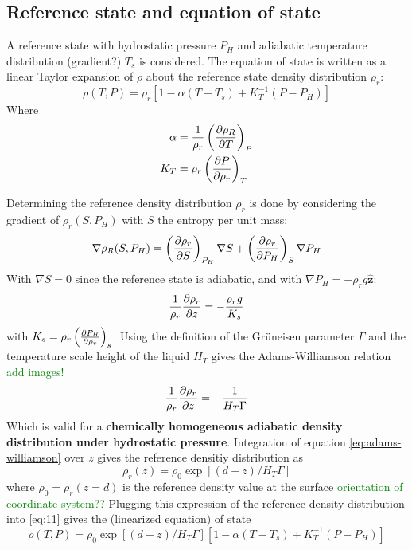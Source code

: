 \documentclass[document.tex]{subfiles}
\begin{document}
\subsection{Reference state and equation of state}
A reference state with hydrostatic pressure $P_H$ and adiabatic temperature distribution (gradient?) $T_s$ is considered. 
The equation of state is written as a linear Taylor expansion of $\rho$ about the reference state density distribution $\rho_r$: 
\begin{equation} \label{eq:11}
    \rho(T,P) = \rho_r[1-\alpha(T-T_s)+K_T^{-1}(P-P_H)]
\end{equation}
Where 
\begin{align}
    \alpha &= \frac{1}{\rho_r} \left(\pdv{\rho_R}{T}\right)_P \\
    K_T &= \rho_r \left(\pdv{P}{\rho_r}\right)_T 
\end{align}

Determining the reference density distribution $\rho_r$ is done by considering the gradient of $\rho_r(S, P_H)$ with $S$ 
the entropy per unit mass: 
\begin{equation}
    \nabla\rho_R(S,P_H) = \left(\pdv{\rho_r}{S}\right)_{P_H} \nabla S + \left(\pdv{\rho_r}{P_H}\right)_S\nabla P_H
\end{equation}
With $\nabla S = 0$ since the reference state is adiabatic, and with $\nabla P_H = -\rho_rg \bm{\hat{z}}$:
\begin{equation}
    \frac{1}{\rho_r} \pdv{\rho_r}{z} = -\frac{\rho_r g}{K_s}
\end{equation} 
with $K_s = \rho_r\left(\pdv{P_H}{\rho_r}\right)_s$. Using the definition of the Grüneisen parameter $\Gamma$ and the temperature scale height of the liquid
$H_T$ gives the Adams-Williamson relation \textcolor{green}{add images!}
\begin{equation} \label{eq:adams-williamson}
    \frac{1}{\rho_r} \pdv{\rho_r}{z} = -\frac{1}{H_T \Gamma}
\end{equation}
Which is valid for a \textbf{chemically homogeneous adiabatic density distribution under hydrostatic pressure}. 
Integration of equation \ref{eq:adams-williamson} over $z$ gives the reference densitiy distribution as
\begin{equation}
    \rho_r(z)= \rho_0 \exp[(d-z)/H_T \Gamma]
\end{equation}
where $\rho_0 = \rho_r(z=d)$ is the reference density value at the surface \textcolor{green}{orientation of coordinate system??}
Plugging this expression of the reference density distribution into \ref{eq:11} gives the (linearized equation) of state
\begin{equation} \label{eq:16}
    \rho(T,P) = \rho_0 \exp[(d-z)/H_T \Gamma][1-\alpha (T-T_s)+K_T^{-1}(P-P_H)]
\end{equation}
\end{document}
